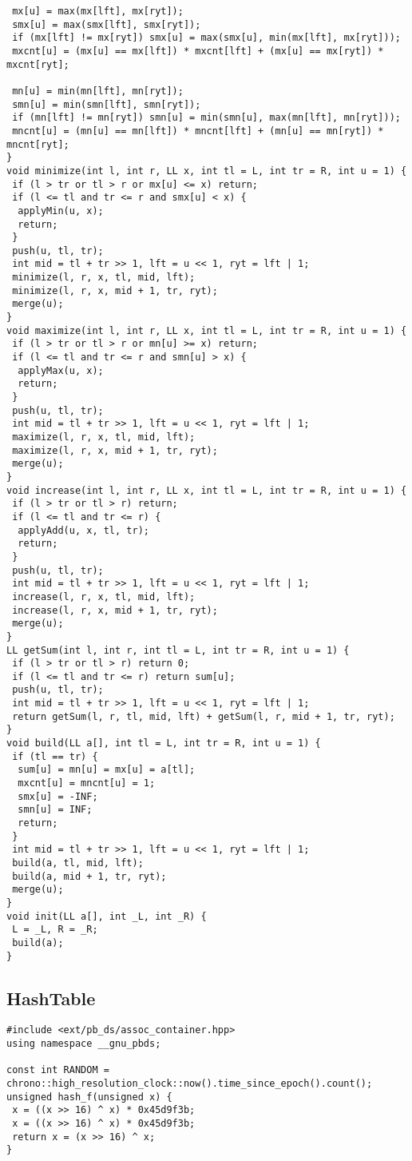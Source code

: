 \documentclass[a4paper,11pt,oneside]{article}
\begin{document}
\begin{multicols*}{\COLS}
\begin{lstlisting}
 mx[u] = max(mx[lft], mx[ryt]);
 smx[u] = max(smx[lft], smx[ryt]);
 if (mx[lft] != mx[ryt]) smx[u] = max(smx[u], min(mx[lft], mx[ryt]));
 mxcnt[u] = (mx[u] == mx[lft]) * mxcnt[lft] + (mx[u] == mx[ryt]) * mxcnt[ryt];

 mn[u] = min(mn[lft], mn[ryt]);
 smn[u] = min(smn[lft], smn[ryt]);
 if (mn[lft] != mn[ryt]) smn[u] = min(smn[u], max(mn[lft], mn[ryt]));
 mncnt[u] = (mn[u] == mn[lft]) * mncnt[lft] + (mn[u] == mn[ryt]) * mncnt[ryt];
}
void minimize(int l, int r, LL x, int tl = L, int tr = R, int u = 1) {
 if (l > tr or tl > r or mx[u] <= x) return;
 if (l <= tl and tr <= r and smx[u] < x) {
  applyMin(u, x);
  return;
 }
 push(u, tl, tr);
 int mid = tl + tr >> 1, lft = u << 1, ryt = lft | 1;
 minimize(l, r, x, tl, mid, lft);
 minimize(l, r, x, mid + 1, tr, ryt);
 merge(u);
}
void maximize(int l, int r, LL x, int tl = L, int tr = R, int u = 1) {
 if (l > tr or tl > r or mn[u] >= x) return;
 if (l <= tl and tr <= r and smn[u] > x) {
  applyMax(u, x);
  return;
 }
 push(u, tl, tr);
 int mid = tl + tr >> 1, lft = u << 1, ryt = lft | 1;
 maximize(l, r, x, tl, mid, lft);
 maximize(l, r, x, mid + 1, tr, ryt);
 merge(u);
}
void increase(int l, int r, LL x, int tl = L, int tr = R, int u = 1) {
 if (l > tr or tl > r) return;
 if (l <= tl and tr <= r) {
  applyAdd(u, x, tl, tr);
  return;
 }
 push(u, tl, tr);
 int mid = tl + tr >> 1, lft = u << 1, ryt = lft | 1;
 increase(l, r, x, tl, mid, lft);
 increase(l, r, x, mid + 1, tr, ryt);
 merge(u);
}
LL getSum(int l, int r, int tl = L, int tr = R, int u = 1) {
 if (l > tr or tl > r) return 0;
 if (l <= tl and tr <= r) return sum[u];
 push(u, tl, tr);
 int mid = tl + tr >> 1, lft = u << 1, ryt = lft | 1;
 return getSum(l, r, tl, mid, lft) + getSum(l, r, mid + 1, tr, ryt);
}
void build(LL a[], int tl = L, int tr = R, int u = 1) {
 if (tl == tr) {
  sum[u] = mn[u] = mx[u] = a[tl];
  mxcnt[u] = mncnt[u] = 1;
  smx[u] = -INF;
  smn[u] = INF;
  return;
 }
 int mid = tl + tr >> 1, lft = u << 1, ryt = lft | 1;
 build(a, tl, mid, lft);
 build(a, mid + 1, tr, ryt);
 merge(u);
}
void init(LL a[], int _L, int _R) {
 L = _L, R = _R;
 build(a);
}
\end{lstlisting}
\subsection{HashTable}
\begin{lstlisting}
#include <ext/pb_ds/assoc_container.hpp>
using namespace __gnu_pbds;

const int RANDOM = chrono::high_resolution_clock::now().time_since_epoch().count();
unsigned hash_f(unsigned x) {
 x = ((x >> 16) ^ x) * 0x45d9f3b;
 x = ((x >> 16) ^ x) * 0x45d9f3b;
 return x = (x >> 16) ^ x;
}


\end{lstlisting}
\end{multicols*}
\end{document}
